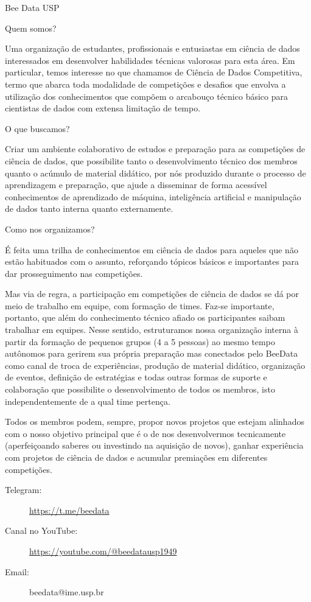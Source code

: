 \begin{subsecao}{Bee Data USP}


Quem somos?

Uma organização de estudantes, profissionais e entusiastas em ciência
de dados interessados em desenvolver habilidades técnicas valorosas para
esta área. Em particular, temos interesse no que chamamos de Ciência de
Dados Competitiva, termo que abarca toda modalidade de competições e desafios
que envolva a utilização dos conhecimentos que compõem o arcabouço técnico
básico para cientistas de dados com extensa limitação de tempo.

O que buscamos?

Criar um ambiente colaborativo de estudos e preparação para as competições de
ciência de dados, que possibilite tanto o desenvolvimento técnico dos membros
quanto o acúmulo de material didático, por nós produzido durante o processo de
aprendizagem e preparação, que ajude a disseminar de forma acessível conhecimentos
de aprendizado de máquina, inteligência artificial e manipulação de dados tanto
interna quanto externamente.

Como nos organizamos?

É feita uma trilha de conhecimentos em ciência de dados para aqueles que não
estão habituados com o assunto, reforçando tópicos básicos e importantes para dar
prosseguimento nas competições.

Mas via de regra, a participação em competições de ciência de dados se dá por meio
de trabalho em equipe, com formação de times. Faz-se importante, portanto, que
além do conhecimento técnico afiado os participantes saibam trabalhar em equipes.
Nesse sentido, estruturamos nossa organização interna à partir da formação de
pequenos grupos (4 a 5 pessoas) ao mesmo tempo autônomos para gerirem sua própria
preparação mas conectados pelo BeeData como canal de troca de experiências, produção
de material didático, organização de eventos, definição de estratégias e todas outras
formas de suporte e colaboração que possibilite o desenvolvimento de todos os membros,
isto independentemente de a qual time pertença.

Todos os membros podem, sempre, propor novos projetos que estejam alinhados com
o nosso objetivo principal que é o de nos desenvolvermos tecnicamente (aperfeiçoando
saberes ou investindo na aquisição de novos), ganhar experiência com projetos de
ciência de dados e acumular premiações em diferentes competições.

\begin{description}
  \item[Telegram:] \url{https://t.me/beedata}
  \item[Canal no YouTube:] \url{https://youtube.com/@beedatausp1949}
  \item[Email:] beedata@ime.usp.br
\end{description}

\end{subsecao}
